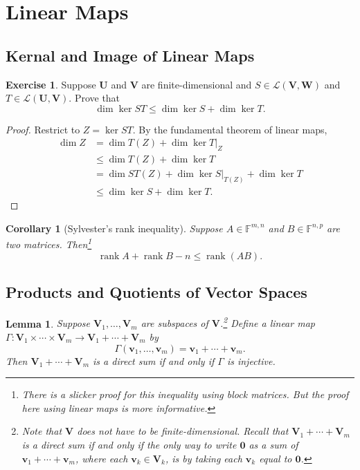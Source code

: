 \documentclass{tufte-handout}
\def \v {\vspace{0.2cm}}
\theoremstyle{plain} %
\newtheorem{cor}[thm]{Corollary}
\newtheorem{lem}[thm]{Lemma}
\theoremstyle{definition}
\newtheorem{exer}[thm]{Exercise}
\theoremstyle{remark}
\newcommand{\bra}[1]{\mathopen{}\left(#1\right)}
\newcommand{\rest}[2]{\mathopen{}\left.#1\right|_{#2}}
\newcommand{\F}{\mathbb{F}}
\newcommand{\mL}{\mathcal{L}}
\newcommand{\zero}{\mathbf{0}}
\newcommand{\U}{\bm{U}}
\newcommand{\V}{\bm{V}}
\newcommand{\W}{\bm{W}}
\renewcommand{\v}{\bm{v}}
\DeclareMathOperator{\rank}{rank}
\begin{document}
\section{Linear Maps}
\subsection{Kernal and Image of Linear Maps}
\begin{exer}
	Suppose $\U$ and $\V$ are finite-dimensional and $S\in\mL\bra{\V,\W}$ and $T\in\mL\bra{\U,\V}$. Prove that
	\[\dim\ker ST \leq \dim\ker S + \dim\ker T.\]
\end{exer}
\begin{proof}
	Restrict to $Z=\ker ST$. By the fundamental theorem of linear maps,
	\begin{align*}
		\dim Z & = \dim T(Z) + \dim\ker \rest{T}{Z} \\
		& \leq \dim T(Z) + \dim\ker T \\
		& = \dim ST(Z) + \dim\ker \rest{S}{T(Z)} + \dim\ker T \\
		& \leq \dim\ker S + \dim\ker T.
	\end{align*}
\end{proof}

\begin{cor}[Sylvester's rank inequality]
	Suppose $A\in\F^{m,n}$ and $B\in\F^{n,p}$ are two matrices. Then\footnote{There is a slicker proof for this inequality using block matrices. But the proof here using linear maps is more informative.}
	\[\rank A+\rank B-n\leq\rank\bra{AB}.\]
\end{cor}

\subsection{Products and Quotients of Vector Spaces}
\begin{lem}\label{lem: direct sum and product space}
	Suppose $\V_1,\dots,\V_m$ are subspaces of $\V$.\footnote{Note that $\V$ does not have to be finite-dimensional. Recall that $\V_1+\cdots+\V_m$ is a direct sum if and only if the only way to write $\zero$ as a sum of $\v_1+\cdots+\v_m$, where each $\v_k\in\V_k$, is by taking each $\v_k$ equal to $\zero$.} Define a linear map $\Gamma: \V_1\times\cdots\times\V_m \to \V_1+\cdots+\V_m$ by
	\[\Gamma\bra{\v_1,\dots,\v_m} = \v_1+\cdots+\v_m.\]
	Then $\V_1+\cdots+\V_m$ is a direct sum if and only if $\Gamma$ is injective.
\end{lem}
\end{document}
